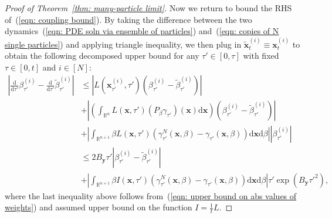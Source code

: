 \documentclass{article}
\numberwithin{equation}{section}
\def\eqref#1{(\ref{#1})}
\newcommand{\dif}{{\mathrm{d}}}
\def\vx{{\bm{x}}}
\def\vy{{\bm{y}}}
\begin{document}
\begin{proof}[Proof of Theorem~\ref{thm: many-particle limit}]
    Now we return to bound the RHS of~\eqref{eqn: coupling bound}. By taking the difference between the two dynamics~\eqref{eqn: PDE soln via ensemble of particles} and~\eqref{eqn: copies of N single particles} and applying triangle inequality, we then plug in $\widetilde{\vx}^{(i)}_t \equiv \vx^{(i)}_t$ to obtain the following decomposed upper bound for any $\tau' \in [0,\tau]$ with fixed $\tau \in [0,t]$ and $i \in [N]$:
    \begin{equation}
    \label{eqn: bound on difference between derivatives}
    \begin{aligned}
    \left|\frac{\dif}{\dif \tau'}\beta^{(i)}_{\tau'} - \frac{\dif}{\dif \tau'}\widetilde{\beta}^{(i)}_{\tau'}\right| &\leq \left|L\left(\vx^{(i)}_{\tau'},\tau'\right)\left(\beta^{(i)}_{\tau'} - \widetilde{\beta}^{(i)}_{\tau'}\right)\right|\\
    &+\left|\left(\int_{\mathbb{R}^n}L\left(\vx,\tau'\right)\left(P_{\beta}\gamma_{\tau'}\right)(\vx)\dif \vx\right)\left(\beta^{(i)}_{\tau'} - \widetilde{\beta}^{(i)}_{\tau'}\right)\right|\\
    &+\left|\int_{\mathbb{R}^{n+1}}\beta L\left(\vx,\tau'\right)\left(\gamma^N_{\tau'}(\vx,\beta) - \gamma_{\tau'}(\vx,\beta)\right)\dif\vx\dif\beta\right|\left|\beta^{(i)}_{\tau'}\right|\\
    &\leq  2B_{\vy}\tau'\left|\beta^{(i)}_{\tau'} - \widetilde{\beta}^{(i)}_{\tau'}\right|\\ &+\left|\int_{\mathbb{R}^{n+1}}\beta I\left(\vx,\tau'\right)\left(\gamma^N_{\tau'}(\vx,\beta) - \gamma_{\tau'}(\vx,\beta)\right)\dif\vx\dif\beta\right|\tau'\exp\left(B_{\vy}\tau'^2\right),
    \end{aligned}    
    \end{equation}
    where the last inequality above follows from~\eqref{eqn: upper bound on abs values of weights} and assumed upper bound on the function $I=\frac{1}{t}L$. 
    

\end{proof}
\end{document}
